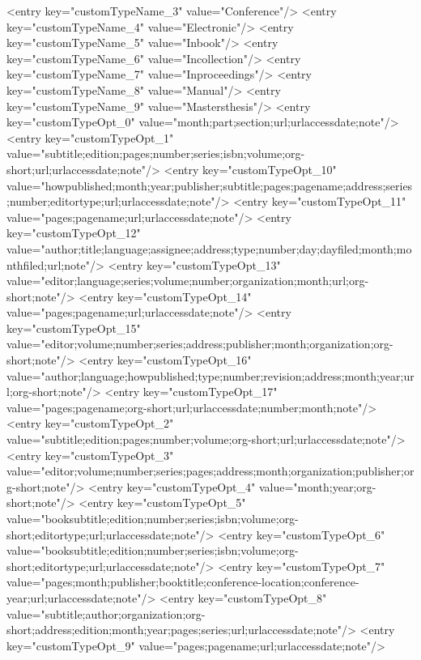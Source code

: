 \begin{codigo}[caption={Código de configuração do programa JabRef em XML}, label={codigo:config-jabref}, language=XML, breaklines=true]
            <entry key="customTypeName_3" value="Conference"/>
            <entry key="customTypeName_4" value="Electronic"/>
            <entry key="customTypeName_5" value="Inbook"/>
            <entry key="customTypeName_6" value="Incollection"/>
            <entry key="customTypeName_7" value="Inproceedings"/>
            <entry key="customTypeName_8" value="Manual"/>
            <entry key="customTypeName_9" value="Mastersthesis"/>
            <entry key="customTypeOpt_0" value="month;part;section;url;urlaccessdate;note"/>
            <entry key="customTypeOpt_1" value="subtitle;edition;pages;number;series;isbn;volume;org-short;url;urlaccessdate;note"/>
            <entry key="customTypeOpt_10" value="howpublished;month;year;publisher;subtitle;pages;pagename;address;series;number;editortype;url;urlaccessdate;note"/>
            <entry key="customTypeOpt_11" value="pages;pagename;url;urlaccessdate;note"/>
            <entry key="customTypeOpt_12" value="author;title;language;assignee;address;type;number;day;dayfiled;month;monthfiled;url;note"/>
            <entry key="customTypeOpt_13" value="editor;language;series;volume;number;organization;month;url;org-short;note"/>
            <entry key="customTypeOpt_14" value="pages;pagename;url;urlaccessdate;note"/>
            <entry key="customTypeOpt_15" value="editor;volume;number;series;address;publisher;month;organization;org-short;note"/>
            <entry key="customTypeOpt_16" value="author;language;howpublished;type;number;revision;address;month;year;url;org-short;note"/>
            <entry key="customTypeOpt_17" value="pages;pagename;org-short;url;urlaccessdate;number;month;note"/>
            <entry key="customTypeOpt_2" value="subtitle;edition;pages;number;volume;org-short;url;urlaccessdate;note"/>
            <entry key="customTypeOpt_3" value="editor;volume;number;series;pages;address;month;organization;publisher;org-short;note"/>
            <entry key="customTypeOpt_4" value="month;year;org-short;note"/>
            <entry key="customTypeOpt_5" value="booksubtitle;edition;number;series;isbn;volume;org-short;editortype;url;urlaccessdate;note"/>
            <entry key="customTypeOpt_6" value="booksubtitle;edition;number;series;isbn;volume;org-short;editortype;url;urlaccessdate;note"/>
            <entry key="customTypeOpt_7" value="pages;month;publisher;booktitle;conference-location;conference-year;url;urlaccessdate;note"/>
            <entry key="customTypeOpt_8" value="subtitle;author;organization;org-short;address;edition;month;year;pages;series;url;urlaccessdate;note"/>
            <entry key="customTypeOpt_9" value="pages;pagename;url;urlaccessdate;note"/>

\end{codigo}

